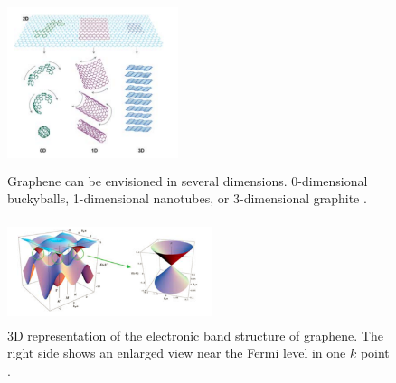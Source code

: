 \documentclass[%
 reprint,
 amsmath,amssymb,
 aps,
pra,
floatfix,
]{revtex4-1}
\begin{document}
\begin{figure}
\includegraphics[height=5cm, width=5cm]{../figs/multiDimGraphene}
\caption{Graphene can be envisioned in several dimensions. 0-dimensional buckyballs, 1-dimensional nanotubes, or 3-dimensional graphite \cite{Novoselov2007}.}
\label{fig:sp2}
\end{figure}



\begin{figure}
\includegraphics[height=3cm, width=6cm]{../figs/grapheneBandGap}
\caption{3D representation of the electronic band structure of graphene. The right side shows an enlarged view near the Fermi level in one $k$ point \cite{nanoscaleReview2011}.}
\label{fig:grapheneBands}
\end{figure}
\end{document}
